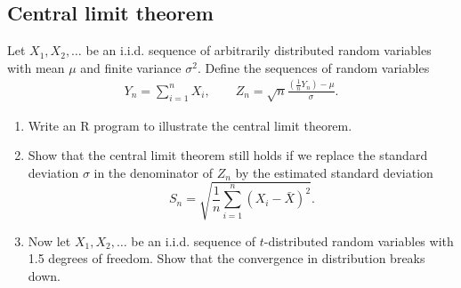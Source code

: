 \documentclass{article}
\begin{document}
\subsection{Central limit theorem}

Let $X_{1},X_{2},\ldots $ be an i.i.d. sequence of arbitrarily distributed
random variables with mean $\mu $ and finite variance $\sigma ^{2}$. Define
the sequences of random variables%
\begin{eqnarray*}
Y_{n} =\sum_{i=1}^{n}X_{i}, \qquad Z_{n} =\sqrt{n}\frac{\left( \frac{1}{n}Y_{n}\right) -\mu }{\sigma }.
\end{eqnarray*}

\begin{enumerate}\setlength{\itemsep}{-1pt}
\item Write an R program to illustrate the central limit theorem.

\item Show that the central limit theorem still holds if we replace the
standard deviation $\sigma $ in the denominator of $Z_{n}$ by the estimated
standard deviation
\begin{equation*}
S_{n}=\sqrt{\frac{1}{n}\sum_{i=1}^{n}\left( X_{i}-\bar{X}\right) ^{2}}.
\end{equation*}

\item Now let $X_{1},X_{2},\ldots $ be an i.i.d. sequence of $t$-distributed
random variables with 1.5 degrees of freedom. Show that the convergence in
distribution breaks down.
\end{enumerate}
\end{document}
